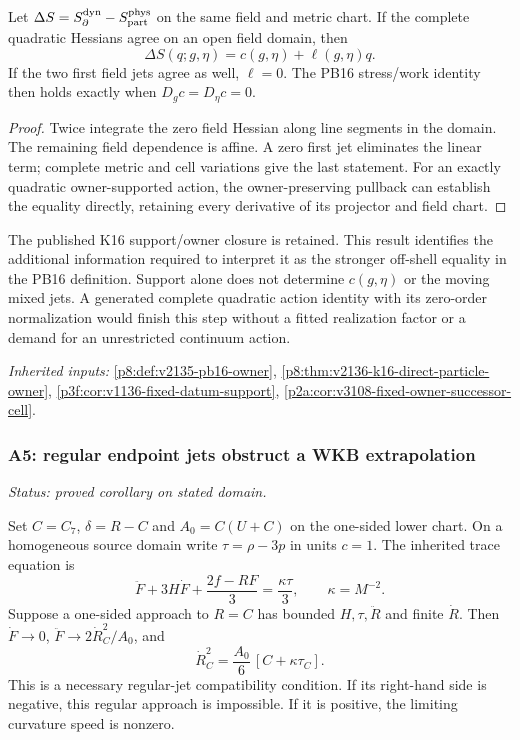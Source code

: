 \documentclass[12pt,a4paper]{article}
\begin{document}
Let $\Delta S=S_\partial^{\rm dyn}-S_{\rm part}^{\rm phys}$ on the same
field and metric chart. If the complete quadratic Hessians agree on an open
field domain, then
\[
 \Delta S(q;g,\eta)=c(g,\eta)+\ell(g,\eta)q.
\]
If the two first field jets agree as well, $\ell=0$. The PB16 stress/work
identity then holds exactly when $D_gc=D_\eta c=0$.
\begin{proof}
Twice integrate the zero field Hessian along line segments in
the domain. The remaining field dependence is affine. A zero first jet
eliminates the linear term; complete metric and cell variations give the
last statement. For an exactly quadratic owner-supported action, the
owner-preserving pullback can establish the equality directly, retaining
every derivative of its projector and field chart.
\end{proof}
The published K16 support/owner closure is retained. This result identifies
the additional information required to interpret it as the stronger
off-shell equality in the PB16 definition. Support alone does not determine
$c(g,\eta)$ or the moving mixed jets. A generated complete quadratic
action identity with its zero-order normalization would finish this step
without a fitted realization factor or a demand for an unrestricted
continuum action. \par\noindent\textit{Inherited inputs:} \ref{p8:def:v2135-pb16-owner}, \ref{p8:thm:v2136-k16-direct-particle-owner}, \ref{p3f:cor:v1136-fixed-datum-support}, \ref{p2a:cor:v3108-fixed-owner-successor-cell}.

\subsubsection{A5: regular endpoint jets obstruct a WKB extrapolation}
\label{p8:sec:v2201-derived-a5}
\noindent\textit{Status: proved corollary on stated domain.}

Set $C=C_7$, $\delta=R-C$ and $A_0=C(U+C)$ on the one-sided lower chart.
On a homogeneous source domain write \(\tau=\rho-3p\) in units \(c=1\).
The inherited trace equation is
\[
\ddot F+3H\dot F+\frac{2f-RF}{3}=\frac{\kappa\tau}{3},
\qquad \kappa=M^{-2}.
\]
Suppose a one-sided approach to \(R=C\) has bounded \(H,\tau,\ddot R\)
and finite \(\dot R\). Then \(\dot F\to0\),
\(\ddot F\to2\dot R_C^2/A_0\), and
\[
\boxed{\dot R_C^2=\frac{A_0}{6}\,[C+\kappa\tau_C].}
\]
This is a necessary regular-jet compatibility condition. If its right-hand
side is negative, this regular approach is impossible. If it is positive,
the limiting curvature speed is nonzero.
\end{document}
